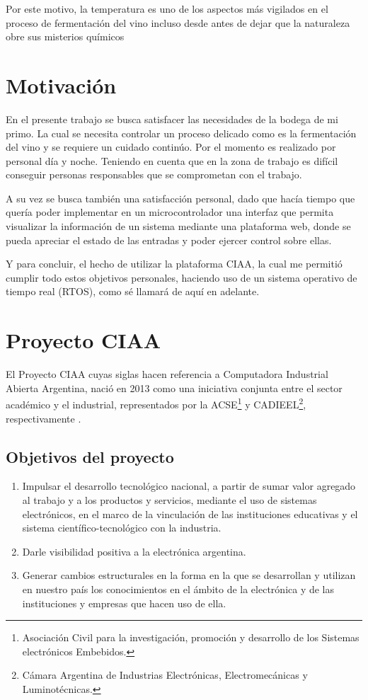   Por este motivo, la temperatura es uno de los aspectos más vigilados en el proceso de fermentación del vino incluso desde antes de dejar que la naturaleza obre sus misterios químicos


\section{Motivación}

En el presente trabajo se busca satisfacer las necesidades de la bodega de mi primo. La cual se necesita controlar un proceso delicado como es la fermentación del vino y se requiere un cuidado continúo. Por el momento es realizado por personal día y noche. Teniendo en cuenta que en la zona de trabajo es difícil conseguir personas responsables que se comprometan con el trabajo. 

A su vez se busca también una satisfacción personal, dado que hacía tiempo que quería poder implementar en un microcontrolador una interfaz que permita visualizar la información de un sistema mediante una plataforma web, donde se pueda apreciar el estado de las entradas y poder ejercer control sobre ellas.

Y para concluir, el hecho de utilizar la plataforma CIAA, la cual me permitió cumplir todo estos objetivos personales, haciendo uso de un sistema operativo de tiempo real (RTOS), como sé llamará de aquí en adelante.



\section{Proyecto CIAA}

El Proyecto CIAA cuyas siglas hacen referencia a Computadora Industrial Abierta Argentina, nació en 2013 como una iniciativa conjunta entre el sector académico y el industrial, representados por la ACSE\footnote{Asociación Civil para la investigación, promoción y desarrollo de los Sistemas electrónicos Embebidos.} y CADIEEL\footnote{Cámara Argentina de Industrias Electrónicas, Electromecánicas y Luminotécnicas.}, respectivamente \citep{CIAA}.

\subsection{Objetivos del proyecto}
\begin{enumerate}
  \item Impulsar el desarrollo tecnológico nacional, a partir de sumar valor agregado al trabajo y a los productos y servicios, mediante el uso de sistemas electrónicos, en el marco de la vinculación de las instituciones educativas y el sistema científico-tecnológico con la industria.
  \item Darle visibilidad positiva a la electrónica argentina.
  \item Generar cambios estructurales en la forma en la que se desarrollan y utilizan en nuestro país los conocimientos en el ámbito de la electrónica y de las instituciones y empresas que hacen uso de ella.
\end{enumerate}

